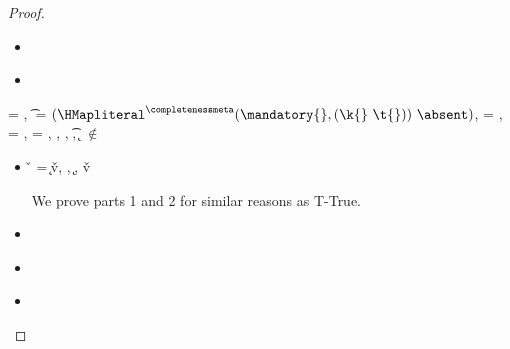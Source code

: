 \begin{lemma}
\begin{enumerate}
\begin{proof}
\begin{case}[T-GetHMapPartialDefault]
\begin{itemize}
\begin{subcase}[B-GetMissing]
      \end{subcase}
    \item[]
      \begin{subcase}[BE-Get1]
      \end{subcase}
    \item[]
      \begin{subcase}[BE-Get2]
      \end{subcase}
  \end{itemize}
\end{case}

\begin{case}[T-Assoc]
  \e{} = { {} {}},
  \t{} = ${\HMapgeneric {\extendmandatoryset {\mandatory{}}{\k{}}{\t{}}} {\absent}}$,
  \thenprop{\prop{}} = {\topprop{}},
  \elseprop{\prop{}} = {\botprop{}},
  \object{} = \emptyobject,
  \judgementtwo {\propenv{}} { {\HMapgeneric {\mandatory{}} {\absent}}},
  \judgementtwo {\propenv{}} { {\Value{\k{}}}},
  \judgementtwo {\propenv{}} { {\t{}}},
  {\k{}} $\not\in$ {\absent{}}

  \begin{itemize}
    \item[]
      \begin{subcase}[B-Assoc]
        \v{} = 
        {
                {\k{}}{\v{v}}},
        \opsem {\openv{}}
        {} {},
        \opsem {\openv{}} {} {\k{}},
        \opsem {\openv{}} {} {\v{v}}

        We prove parts 1 and 2 for similar reasons as T-True.
      \end{subcase}
    \item[]
      \begin{subcase}[BE-Assoc1]
      \end{subcase}
    \item[]
      \begin{subcase}[BE-Assoc2]
      \end{subcase}
    \item[]
      \begin{subcase}[BE-Assoc3]
      \end{subcase}
  \end{itemize}
\end{case}

\begin{case}[T-If]


\end{case}
\end{proof}
\end{enumerate}
\end{lemma}
